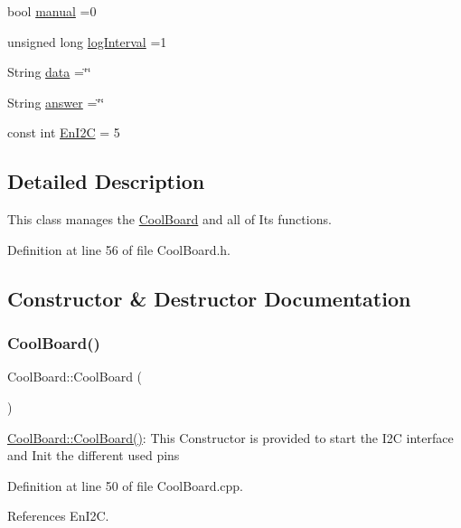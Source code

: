 \begin{DoxyCompactItemize}
\item 
bool \hyperlink{class_cool_board_a7c8e505a5804b109e112d5a03df6ea2b}{manual} =0
\item 
unsigned long \hyperlink{class_cool_board_a84bc94413b64973e4aba8c467c97006c}{log\+Interval} =1
\item 
String \hyperlink{class_cool_board_a427fb753dd8575bdf821c70a5c63d695}{data} =\char`\"{}\char`\"{}
\item 
String \hyperlink{class_cool_board_a7b835fafd449e5282f7f91d787a2dc15}{answer} =\char`\"{}\char`\"{}
\item 
const int \hyperlink{class_cool_board_af1fe1376fc66f93dee80b327ca695377}{En\+I2C} = 5
\end{DoxyCompactItemize}


\subsection{Detailed Description}
This class manages the \hyperlink{class_cool_board}{Cool\+Board} and all of Its functions. 

Definition at line 56 of file Cool\+Board.\+h.



\subsection{Constructor \& Destructor Documentation}
\mbox{\label{class_cool_board_a8b88fd781e22e93025dd63474113b7e4}} 
\subsubsection{\texorpdfstring{Cool\+Board()}{CoolBoard()}}
{\footnotesize\ttfamily Cool\+Board\+::\+Cool\+Board (\begin{DoxyParamCaption}{ }\end{DoxyParamCaption})}

\hyperlink{class_cool_board_a8b88fd781e22e93025dd63474113b7e4}{Cool\+Board\+::\+Cool\+Board()}\+: This Constructor is provided to start the I2C interface and Init the different used pins 

Definition at line 50 of file Cool\+Board.\+cpp.



References En\+I2C.



